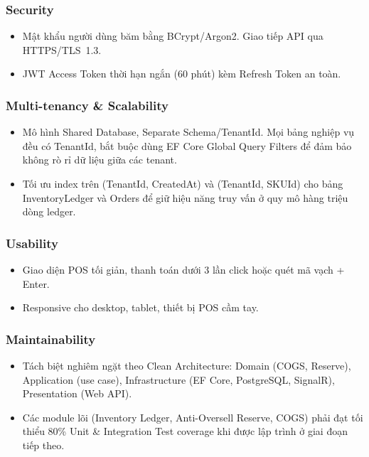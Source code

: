 \subsubsection{Security}
\begin{itemize}
    \item Mật khẩu người dùng băm bằng BCrypt/Argon2. Giao tiếp API qua HTTPS/TLS~1.3.
    \item JWT Access Token thời hạn ngắn (60 phút) kèm Refresh Token an toàn.
\end{itemize}

\subsubsection{Multi-tenancy \& Scalability}
\begin{itemize}
    \item Mô hình Shared Database, Separate Schema/TenantId. Mọi bảng nghiệp vụ đều có TenantId, bắt buộc dùng EF Core Global Query Filters để đảm bảo không rò rỉ dữ liệu giữa các tenant.
    \item Tối ưu index trên (TenantId, CreatedAt) và (TenantId, SKUId) cho bảng InventoryLedger và Orders để giữ hiệu năng truy vấn ở quy mô hàng triệu dòng ledger.
\end{itemize}

\subsubsection{Usability}
\begin{itemize}
    \item Giao diện POS tối giản, thanh toán dưới 3 lần click hoặc quét mã vạch + Enter.
    \item Responsive cho desktop, tablet, thiết bị POS cầm tay.
\end{itemize}

\subsubsection{Maintainability}
\begin{itemize}
    \item Tách biệt nghiêm ngặt theo Clean Architecture: Domain (COGS, Reserve), Application (use case), Infrastructure (EF Core, PostgreSQL, SignalR), Presentation (Web API).
    \item Các module lõi (Inventory Ledger, Anti-Oversell Reserve, COGS) phải đạt tối thiểu 80\% Unit \& Integration Test coverage khi được lập trình ở giai đoạn tiếp theo.
\end{itemize}
